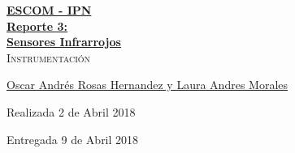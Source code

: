 \documentclass[12pt, fleqn]{article}                            %
\author{Oscar Andrés Rosas}                                     %
\theoremstyle{break}                                            %
\begin{document}
\begin{titlepage}
    
    \pagecolor{TitlePageColor}                                      %
    \color{white}                                                   %

    \vspace                                                         %
    \baselineskip                                                   %

    \makebox[0pt][l]{\rule{1.3\textwidth}{3pt}}                     %
    
    \href{https://compilandoconocimiento.com}                       %
    {\textbf{\textsc{\Huge ESCOM - IPN}}}\\[2.7cm]                  %

    \href{\ProjectNameLink/LibroAnalisisDeAlgoritmos}               %
    {\fontsize{35}{40}                                              %
        \selectfont
        \textbf{Reporte 3: \\Sensores Infrarrojos}}\\[0.5cm]        %
    \textcolor{ColorSubtext}                                        %
        {\textsc{\LARGE Instrumentación}}                           %
    
    \vfill                                                          %
    
    \href{\ProjectAuthorLink}                                       %
    {\LARGE 
    \textsf{Oscar Andrés Rosas Hernandez y Laura Andres Morales}}   %

    \vspace                                                         %
    \baselineskip                                                   %
    
    {\large \textsf{Realizada 2 de Abril 2018}}                     %
    
    {\large \textsf{Entregada 9 de Abril 2018}}                     %

\end{titlepage}
\end{document}
